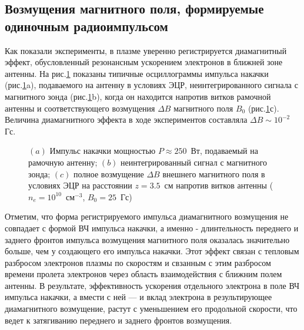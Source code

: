\documentclass[autoref,10pt]{disser}
\begin{document}
\subsection{Возмущения магнитного поля, формируемые одиночным радиоимпульсом}
Как показали эксперименты, в плазме уверенно регистрируется диамагнитный эффект, обусловленный резонансным ускорением электронов в ближней зоне антенны. На \mbox{рис.\ref{fig:pump}} показаны типичные осциллограммы импульса накачки (\mbox{рис.\ref{fig:pump}}a), подаваемого на антенну в условиях ЭЦР, неинтегрированного сигнала с магнитного зонда (\mbox{рис.\ref{fig:pump}}b),  когда он находится напротив витков рамочной антенны  и соответствующего возмущения $\Delta{}B$ магнитного поля $B_{0}$ (\mbox{рис.\ref{fig:pump}}с). Величина диамагнитного эффекта в ходе экспериментов составляла $\Delta{}B\sim{}10^{-2}$\,Гс.

\begin{figure}[H]
  \centering
  \def\svgwidth{0.6\columnwidth} %
  
  \caption{$(a)$ Импульс накачки мощностью $P\approx{}250$~Вт, подаваемый на рамочную антенну; $(b)$ неинтегрированный сигнал с магнитного зонда; $(c)$ полное возмущение $\Delta{}B$ внешнего магнитного поля в условиях ЭЦР на расстоянии $z=3.5$~см напротив витков антенны ($n_{e}=10^{10}$~см$^{-3}$, $B_{0} = 25$~Гс)}
  \label{fig:pump}
\end{figure}

Отметим, что форма регистрируемого импульса диамагнитного возмущения не совпадает с формой ВЧ импульса накачки, а именно - длинтельность переднего и заднего фронтов импульса возмущения магнитного поля  оказалась значительно больше, чем у создающего его импульса накачки.  Этот эффект связан с тепловым разбросом электронов плазмы по скоростям и свзанным с этим разбросом времени пролета электронов через область взаимодействия с ближним полем антенны. В результате, эффективность ускорения отдельного электрона в поле ВЧ импульса накачки, а вмести с ней --- и вклад электрона в результирующее диамагнитного возмущение, растут с уменьшением его продольной скорости, что ведет к затягиванию переднего и заднего фронтов возмущения. 
\end{document}
